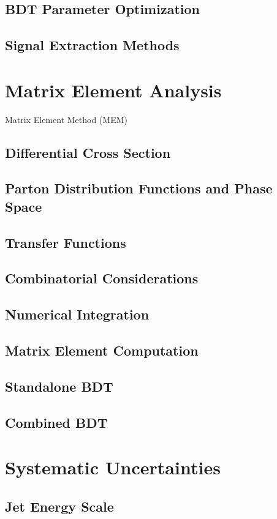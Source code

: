 \subsection{BDT Parameter Optimization}
\subsection{Signal Extraction Methods}

\section{Matrix Element Analysis}
Matrix Element Method (MEM)
\subsection{Differential Cross Section}
\subsection{Parton Distribution Functions and Phase Space}
\subsection{Transfer Functions}
\subsection{Combinatorial Considerations}
\subsection{Numerical Integration}
\subsection{Matrix Element Computation}
\subsection{Standalone BDT}
\subsection{Combined BDT}

\section{Systematic Uncertainties}
\subsection{Jet Energy Scale}
